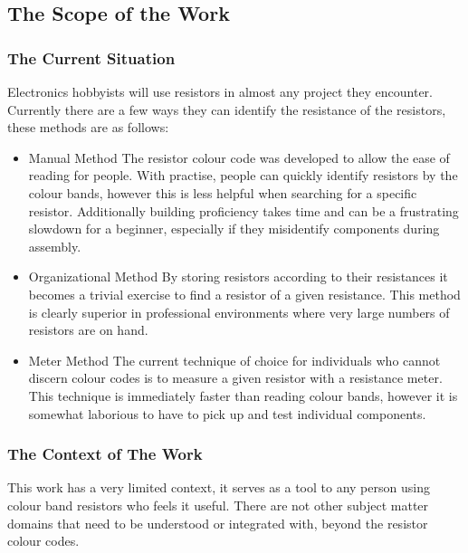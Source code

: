 \documentclass{article}
\begin{document}
\subsection{The Scope of the Work}

\subsubsection{The Current Situation}

Electronics hobbyists will use resistors in almost any project they encounter.
Currently there are a few ways they can identify the resistance of the resistors, these methods are as follows:
\begin{itemize}

\item Manual Method
\subitem The resistor colour code was developed to allow the ease of reading for people. 
With practise, people can quickly identify resistors by the colour bands, however this is less helpful when searching  for a specific resistor.
Additionally building proficiency takes time and can be a frustrating slowdown for a beginner, especially if they misidentify components during assembly.

\item Organizational Method
\subitem By storing resistors according to their resistances it becomes a trivial exercise to find a resistor of a given resistance.
This method is clearly superior in professional environments where very large numbers of resistors are on hand.

\item Meter Method
\subitem The current technique of choice for individuals who cannot discern colour codes is to measure a given resistor with a resistance meter.
This technique is immediately faster than reading colour bands, however it is somewhat laborious to have to pick up and test individual components.

\end{itemize}

\subsubsection{The Context of The Work}

This work has a very limited context, it serves as a tool to any person using colour band resistors who feels it useful.
There are not other subject matter domains that need to be understood or integrated with, beyond the resistor colour codes.
\end{document}
